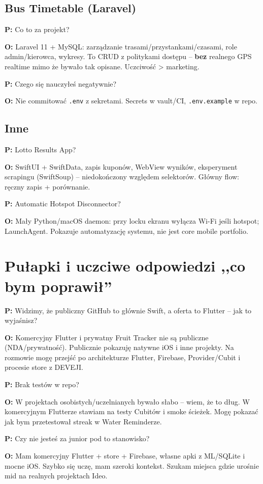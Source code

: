 \documentclass[11pt,a4paper]{article}
\newcommand{\pyt}[1]{\par\medskip\noindent\textbf{P:} #1\par}
\newcommand{\odp}[1]{\noindent\textbf{O:} #1\par}
\begin{document}
\subsection{Bus Timetable (Laravel)}

\pyt{Co to za projekt?}
\odp{Laravel 11 + MySQL: zarządzanie trasami/przystankami/czasami, role admin/kierowca, wykresy. To CRUD z politykami dostępu -- \textbf{bez} realnego GPS realtime mimo że bywało tak opisane. Uczciwość > marketing.}

\pyt{Czego się nauczyłeś negatywnie?}
\odp{Nie commitować \texttt{.env} z sekretami. Secrets w vault/CI, \texttt{.env.example} w repo.}

\subsection{Inne}

\pyt{Lotto Results App?}
\odp{SwiftUI + SwiftData, zapis kuponów, WebView wyników, eksperyment scrapingu (SwiftSoup) -- niedokończony względem selektorów. Główny flow: ręczny zapis + porównanie.}

\pyt{Automatic Hotspot Disconnector?}
\odp{Mały Python/macOS daemon: przy locku ekranu wyłącza Wi-Fi jeśli hotspot; LaunchAgent. Pokazuje automatyzację systemu, nie jest core mobile portfolio.}

\section{Pułapki i uczciwe odpowiedzi ,,co bym poprawił''}

\pyt{Widzimy, że publiczny GitHub to głównie Swift, a oferta to Flutter -- jak to wyjaśnisz?}
\odp{Komercyjny Flutter i prywatny Fruit Tracker nie są publiczne (NDA/prywatność). Publicznie pokazuję natywne iOS i inne projekty. Na rozmowie mogę przejść po architekturze Flutter, Firebase, Provider/Cubit i procesie store z DEVEJI.}

\pyt{Brak testów w repo?}
\odp{W projektach osobistych/uczelnianych bywało słabo -- wiem, że to dług. W komercyjnym Flutterze stawiam na testy Cubitów i smoke ścieżek. Mogę pokazać jak bym przetestował streak w Water Reminderze.}

\pyt{Czy nie jesteś za junior pod to stanowisko?}
\odp{Mam komercyjny Flutter + store + Firebase, własne apki z ML/SQLite i mocne iOS. Szybko się uczę, mam szeroki kontekst. Szukam miejsca gdzie urośnie mid na realnych projektach Ideo.}
\end{document}
